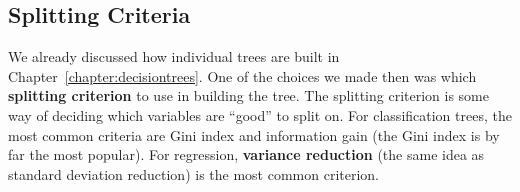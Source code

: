 \subsection{Splitting Criteria}

We already discussed how individual trees are built in Chapter~\ref{chapter:decisiontrees}. One of the choices we made then was which \textbf{splitting criterion} to use in building the tree. The splitting criterion is some way of deciding which variables are ``good'' to split on. For classification trees, the most common criteria are Gini index and information gain (the Gini index is by far the most popular). For regression, \textbf{variance reduction} (the same idea as standard deviation reduction) is the most common criterion.

\vspace{4mm}

